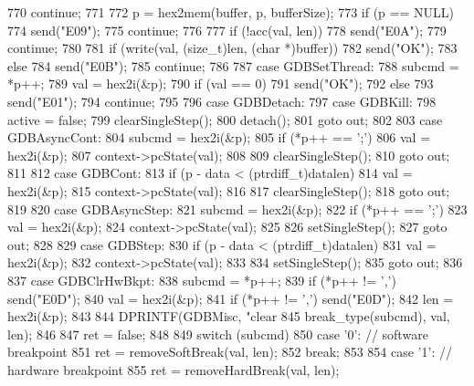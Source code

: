 \begin{DoxyCode}
{{{{770                 continue;
771             }
772             p = hex2mem(buffer, p, bufferSize);
773             if (p == NULL) {
774                 send("E09");
775                 continue;
776             }
777             if (!acc(val, len)) {
778                 send("E0A");
779                 continue;
780             }
781             if (write(val, (size_t)len, (char *)buffer))
782               send("OK");
783             else
784               send("E0B");
785             continue;
786 
787           case GDBSetThread:
788             subcmd = *p++;
789             val = hex2i(&p);
790             if (val == 0)
791                 send("OK");
792             else
793                 send("E01");
794             continue;
795 
796           case GDBDetach:
797           case GDBKill:
798             active = false;
799             clearSingleStep();
800             detach();
801             goto out;
802 
803           case GDBAsyncCont:
804             subcmd = hex2i(&p);
805             if (*p++ == ';') {
806                 val = hex2i(&p);
807                 context->pcState(val);
808             }
809             clearSingleStep();
810             goto out;
811 
812           case GDBCont:
813             if (p - data < (ptrdiff_t)datalen) {
814                 val = hex2i(&p);
815                 context->pcState(val);
816             }
817             clearSingleStep();
818             goto out;
819 
820           case GDBAsyncStep:
821             subcmd = hex2i(&p);
822             if (*p++ == ';') {
823                 val = hex2i(&p);
824                 context->pcState(val);
825             }
826             setSingleStep();
827             goto out;
828 
829           case GDBStep:
830             if (p - data < (ptrdiff_t)datalen) {
831                 val = hex2i(&p);
832                 context->pcState(val);
833             }
834             setSingleStep();
835             goto out;
836 
837           case GDBClrHwBkpt:
838             subcmd = *p++;
839             if (*p++ != ',') send("E0D");
840             val = hex2i(&p);
841             if (*p++ != ',') send("E0D");
842             len = hex2i(&p);
843 
844             DPRINTF(GDBMisc, "clear %
845                     break_type(subcmd), val, len);
846 
847             ret = false;
848 
849             switch (subcmd) {
850               case '0': // software breakpoint
851                 ret = removeSoftBreak(val, len);
852                 break;
853 
854               case '1': // hardware breakpoint
855                 ret = removeHardBreak(val, len);
}}}}
\end{DoxyCode}
